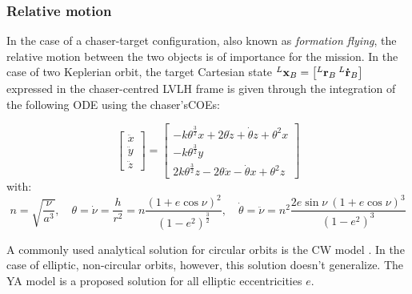 \subsubsection{Relative motion}
In the case of a chaser-target configuration, also known as \emph{formation flying}, the relative motion between the two objects is of importance for the mission. In the case of two Keplerian orbit, the target Cartesian state $^{L}\boldsymbol{\mathbf{x}}_B = \left[^{L}\boldsymbol{\mathbf{r}}_B \: ^{L}\boldsymbol{\mathbf{\dot{r}}}_B \right]$ expressed in the chaser-centred \gls{LVLH} frame is given through the integration of the following \gls{ODE} using the chaser's\gls{COEs}:

\begin{equation} \label{eq:eq_diff_rel_motion}
	\left[ \begin{array} { c } { \ddot { x } } \\ { \ddot { y } } \\ { \ddot { z } } \end{array} \right] = \left[ \begin{array} { c } { - k \theta ^ { \frac { 3 } { 2 } } x + 2 \theta \dot { z } + \dot { \theta } z + \theta ^ { 2 } x } \\ { - k \theta ^ { \frac { 3 } { 2 } } y } \\ { 2 k \theta ^ { \frac { 3 } { 2 } } z - 2 \theta \dot { x } - \dot { \theta } x + \theta ^ { 2 } z } \end{array} \right]
\end{equation}
with:
\begin{equation}
	n = \sqrt{\frac{\nu}{a^3}}, \quad \theta = \dot{\nu} = \frac{h}{r^2} = n\frac{(1+e\cos{\nu})^2}{(1-e^2)^\frac{3}{2}}, \quad  \dot{\theta} = \ddot{\nu} = n^2\frac{2e\sin{\nu}\:(1+e\cos\nu)^3}{(1-e^2)^3}
\end{equation}

A commonly used analytical solution for circular orbits is the \gls{CW} model \cite{schaub_analytical_2003}. In the case of elliptic, non-circular orbits, however, this solution doesn't generalize. The \gls{YA} model \cite{yamanaka_new_2002} is a proposed solution for all elliptic eccentricities $e$.

